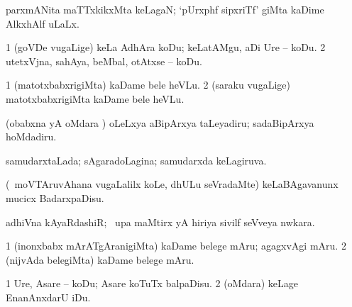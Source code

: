 {\bentry
{} 
\gl{\gu}
\expl{}
\bmng
 parxmANita maTTxkikxMta keLagaN; `pUrxphf sipxriTf' giMta kaDime AlkxhAlf uLaLx. 
\emng
\eentry

\bentry
{} 
\gl{\sakirx}
\bmng
\bnum
\num{1} (goVDe \mo vugaLige) keLa AdhAra koDu; keLatAMgu, aDi Ure -- koDu. 
\num{2} utetxVjna, sahAya, beMbal, otAtxse -- koDu. 
\enum
\emng
\eentry

\bentry
{} 
\gl{\sakirx}
\expl{}
\bmng
\bnum
\num{1} (matotxbabxrigiMta) kaDame bele heVLu. 
\num{2} (saraku \mo vugaLige) matotxbabxrigiMta kaDame bele heVLu. 
\enum
\emng
\eentry

\bentry
{} 
\gl{\sakirx}
\expl{}
\bmng
 (obabxna yA oMdara \vi) oLeLxya aBipArxya taLeyadiru; sadaBipArxya hoMdadiru. 
\emng
\eentry

\bentry
{} 
\gl{\sakirx}
\expl{}
\bmng
\emng
\eentry

\bentry
{} 
\gl{\nA}
\expl{}
\bmng
\emng
\eentry

\bentry
{} 
\gl{\gu}
\expl{}
\bmng
 samudarxtaLada; sAgaradoLagina; samudarxda keLagiruva. 
\emng
\eentry

\bentry
{} 
\gl{\sakirx}
\expl{}
\bmng
 (\kanmu\ moVTAruvAhana \mo vugaLalilx koLe, dhULu seVradaMte) keLaBAgavanunx mucicx BadarxpaDisu. 
\emng
\eentry

\bentry
{} 
\gl{\nA}
\bmng
 adhiVna kAyaRdashiR; \kanmu\ upa maMtirx yA hiriya sivilf seVveya nwkara. 
\emng
\eentry

\bentry
{} 
\gl{\sakirx}
\expl{}
\bmng
\bnum
\num{1} (inonxbabx mArATgAranigiMta) kaDame belege mAru; agagxvAgi mAru. 
\num{2} (nijvAda belegiMta) kaDame belege mAru. 
\enum
\emng
\eentry

\bentry
{} 
\gl{\sakirx}
\bmng
\bnum
\num{1} Ure, Asare -- koDu; Asare koTuTx balpaDisu. 
\num{2} (oMdara) keLage EnanAnxdarU iDu. 
\enum
\emng
\eentry

}
